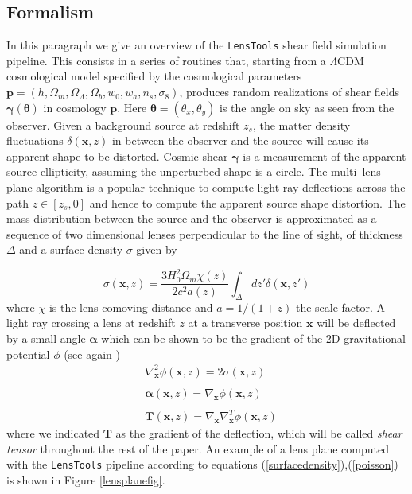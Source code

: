 \documentclass[reprint,aps,prd,superscriptaddress,showkeys,showpacs]{revtex4-1}
\newcommand{\bb}[1]{\mathbf{#1}}
\newcommand{\LT}{\texttt{LensTools} }
\begin{document}
\subsection{Formalism}
%
In this paragraph we give an overview of the \LT shear field simulation pipeline. This consists in a series of routines that, starting from a $\Lambda$CDM cosmological model specified by the cosmological parameters $\bb{p}=(h,\Omega_m,\Omega_\Lambda,\Omega_b,w_0,w_a,n_s,\sigma_8)$, produces random realizations of shear fields $\pmb{\gamma}(\pmb{\theta})$ in cosmology $\bb{p}$. Here $\pmb{\theta}=(\theta_x,\theta_y)$ is the angle on sky as seen from the observer. Given a background source at redshift $z_s$, the matter density fluctuations $\delta(\bb{x},z)$ in between the observer and the source will cause its apparent shape to be distorted. Cosmic shear $\pmb{\gamma}$ is a measurement of the apparent source ellipticity, assuming the unperturbed shape is a circle. The multi--lens--plane algorithm \citep{RayTracingHartlap,Ray1,Ray2,Ray3} is a popular technique to compute light ray deflections across the path $z\in[z_s,0]$ and hence to compute the apparent source shape distortion. The mass distribution between the source and the observer is approximated as a sequence of two dimensional lenses perpendicular to the line of sight, of thickness $\Delta$ and a surface density $\sigma$ given by 

\begin{equation}
\label{surfacedensity}
\sigma(\bb{x},z) = \frac{3H_0^2\Omega_m\chi(z)}{2c^2a(z)}\int_\Delta dz'\delta(\bb{x},z')
\end{equation}
%
where $\chi$ is the lens comoving distance and $a=1/(1+z)$ the scale factor. A light ray crossing a lens at redshift $z$ at a transverse position $\bb{x}$ will be deflected by a small angle $\pmb{\alpha}$ which can be shown to be the gradient of the 2D gravitational potential $\phi$ (see again \citep{RayTracingHartlap}) 
%
\begin{equation}
\label{poisson}
\begin{matrix}
& \nabla^2_\bb{x} \phi(\bb{x},z) = 2\sigma(\bb{x},z) \\ \\
& \pmb{\alpha}(\bb{x},z) = \nabla_\bb{x} \phi(\bb{x},z) \\ \\
& \bb{T}(\bb{x},z) = \nabla_\bb{x}\nabla_\bb{x}^T \phi(\bb{x},z)
\end{matrix}
\end{equation}
%
where we indicated $\bb{T}$ as the gradient of the deflection, which will be called \textit{shear tensor} throughout the rest of the paper. An example of a lens plane computed with the \LT pipeline according to equations (\ref{surfacedensity}),(\ref{poisson}) is shown in Figure \ref{lensplanefig}. 
\end{document}
